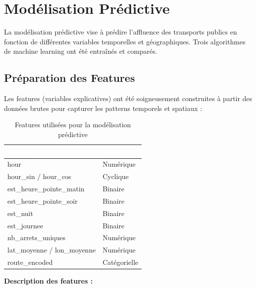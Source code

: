 \documentclass[12pt,a4paper]{article}
\begin{document}
\newpage
\section{Modélisation Prédictive}

La modélisation prédictive vise à prédire l'affluence des transports publics en fonction de différentes variables temporelles et géographiques. Trois algorithmes de machine learning ont été entraînés et comparés.

\subsection{Préparation des Features}

Les features (variables explicatives) ont été soigneusement construites à partir des données brutes pour capturer les patterns temporels et spatiaux :

\begin{table}[H]
\centering
\begin{tabular}{|l|l|}
\hline
\rowcolor{bleuTBM} \textcolor{white}{\textbf{Feature}} & \textcolor{white}{\textbf{Type}} \\
\hline
hour & Numérique \\
\hline
\rowcolor{grisClair} hour\_sin / hour\_cos & Cyclique \\
\hline
est\_heure\_pointe\_matin & Binaire \\
\hline
\rowcolor{grisClair} est\_heure\_pointe\_soir & Binaire \\
\hline
est\_nuit & Binaire \\
\hline
\rowcolor{grisClair} est\_journee & Binaire \\
\hline
nb\_arrets\_uniques & Numérique \\
\hline
\rowcolor{grisClair} lat\_moyenne / lon\_moyenne & Numérique \\
\hline
route\_encoded & Catégorielle \\
\hline
\end{tabular}
\caption{Features utilisées pour la modélisation prédictive}
\end{table}

\textbf{Description des features :}
\end{document}
